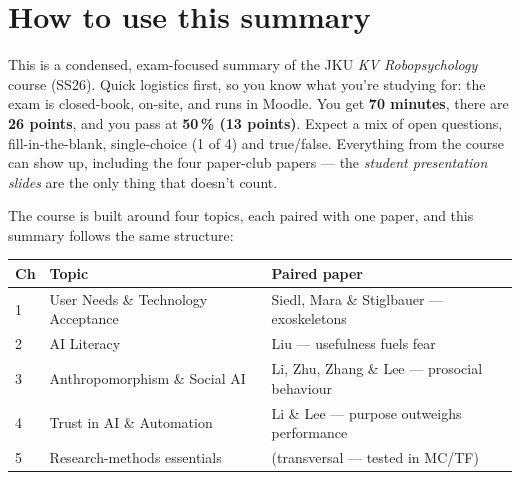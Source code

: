\documentclass[11pt, oneside]{book}
\begin{document}
\setcounter{tocdepth}{2}  %

\begingroup
  \let\cleardoublepage\relax
  \let\clearpage\relax
  \tableofcontents
\endgroup

\mainmatter  %


\chapter*{How to use this summary}

This is a condensed, exam-focused summary of the JKU \emph{KV
Robopsychology} course (SS26). Quick logistics first, so you know what
you're studying for: the exam is closed-book, on-site, and runs in
Moodle. You get \textbf{70 minutes}, there are \textbf{26 points}, and you
pass at \textbf{50\,\% (13 points)}. Expect a mix of open questions,
fill-in-the-blank, single-choice (1 of 4) and true/false. Everything from
the course can show up, including the four paper-club papers — the
\emph{student presentation slides} are the only thing that doesn't count.

The course is built around four topics, each paired with one paper, and
this summary follows the same structure:

\begin{center}
\small
\begin{tabular}{@{}p{0.5cm} p{5.4cm} p{8.6cm}@{}}
\toprule
\textbf{Ch} & \textbf{Topic} & \textbf{Paired paper} \\
\midrule
1 & User Needs \& Technology Acceptance & Siedl, Mara \& Stiglbauer — exoskeletons \\
2 & AI Literacy & Liu — usefulness fuels fear \\
3 & Anthropomorphism \& Social AI & Li, Zhu, Zhang \& Lee — prosocial behaviour \\
4 & Trust in AI \& Automation & Li \& Lee — purpose outweighs performance \\
5 & Research-methods essentials & (transversal — tested in MC/TF) \\
\bottomrule
\end{tabular}
\end{center}
\end{document}
